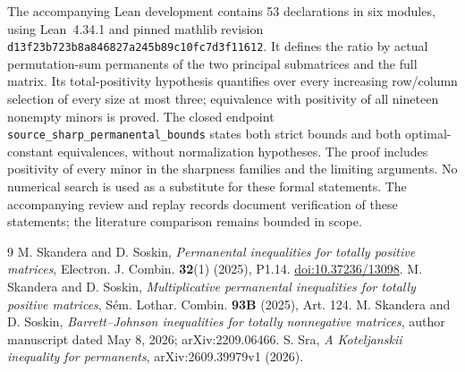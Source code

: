 \documentclass[11pt]{article}
\begin{document}
The accompanying Lean development contains 53 declarations in six modules,
using Lean~4.34.1 and pinned mathlib revision
\texttt{d13f23b723b8a846827a245b89c10fc7d3f11612}.
It defines the ratio by actual permutation-sum permanents of the two
principal submatrices and the full matrix. Its total-positivity hypothesis
quantifies over every increasing row/column selection of every size at most
three; equivalence with positivity of all nineteen nonempty minors is proved.
The closed endpoint \texttt{source\_sharp\_permanental\_bounds} states both
strict bounds and both optimal-constant equivalences, without normalization
hypotheses. The proof includes positivity of every minor in the sharpness
families and the limiting arguments. No numerical search is used as a
substitute for these formal statements. The accompanying review and replay records document verification of these
statements; the literature comparison remains bounded in scope.

\begin{thebibliography}{9}
 M. Skandera and D. Soskin,
\emph{Permanental inequalities for totally positive matrices},
Electron. J. Combin. \textbf{32}(1) (2025), P1.14.
\href{https://doi.org/10.37236/13098}{doi:10.37236/13098}.
 M. Skandera and D. Soskin,
\emph{Multiplicative permanental inequalities for totally positive matrices},
S\'em. Lothar. Combin. \textbf{93B} (2025), Art. 124.
 M. Skandera and D. Soskin,
\emph{Barrett--Johnson inequalities for totally nonnegative matrices},
author manuscript dated May 8, 2026; arXiv:2209.06466.
 S. Sra, \emph{A Koteljanskii inequality for permanents},
arXiv:2609.39979v1 (2026).
\end{thebibliography}
\end{document}
